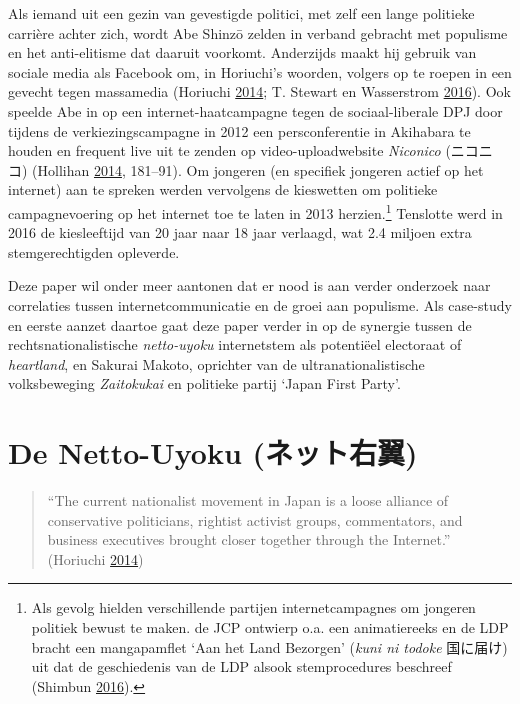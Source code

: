 \documentclass[10.5pt,dutch,]{article}
\begin{document}
Als iemand uit een gezin van gevestigde politici, met zelf een lange
politieke carrière achter zich, wordt Abe Shinzō zelden in verband
gebracht met populisme en het anti-elitisme dat daaruit voorkomt.
Anderzijds maakt hij gebruik van sociale media als Facebook om, in
Horiuchi's woorden, volgers op te roepen in een gevecht tegen massamedia
(Horiuchi \protect\hyperlink{ref-horiuchiux5fpublicux5f2014}{2014}; T.
Stewart en Wasserstrom
\protect\hyperlink{ref-t.ux5fstewartux5fglobalux5f2016}{2016}). Ook
speelde Abe in op een internet-haatcampagne tegen de sociaal-liberale
DPJ door tijdens de verkiezingscampagne in 2012 een persconferentie in
Akihabara te houden en frequent live uit te zenden op
video-uploadwebsite \emph{Niconico} (ニコニコ) (Hollihan
\protect\hyperlink{ref-hollihanux5fdisputeux5f2014}{2014}, 181--91). Om
jongeren (en specifiek jongeren actief op het internet) aan te spreken
werden vervolgens de kieswetten om politieke campagnevoering op het
internet toe te laten in 2013 herzien.\footnote{Als gevolg hielden
  verschillende partijen internetcampagnes om jongeren politiek bewust
  te maken. de JCP ontwierp o.a. een animatiereeks en de LDP bracht een
  mangapamflet `Aan het Land Bezorgen' (\emph{kuni ni todoke} 国に届け)
  uit dat de geschiedenis van de LDP alsook stemprocedures beschreef
  (Shimbun
  \protect\hyperlink{ref-asahiux5fshimbunux5felectionsux5f2016}{2016}).}
Tenslotte werd in 2016 de kiesleeftijd van 20 jaar naar 18 jaar
verlaagd, wat 2.4 miljoen extra stemgerechtigden opleverde.

Deze paper wil onder meer aantonen dat er nood is aan verder onderzoek
naar correlaties tussen internetcommunicatie en de groei aan populisme.
Als case-study en eerste aanzet daartoe gaat deze paper verder in op de
synergie tussen de rechtsnationalistische \emph{netto-uyoku}
internetstem als potentiëel electoraat of \emph{heartland}, en Sakurai
Makoto, oprichter van de ultranationalistische volksbeweging
\emph{Zaitokukai} en politieke partij `Japan First Party'.

\newpage

\section{De Netto-Uyoku
(ネット右翼)}\label{de-netto-uyoku-ux30cdux30c3ux30c8ux53f3ux7ffc}

\begin{quote}
``The current nationalist movement in Japan is a loose alliance of
conservative politicians, rightist activist groups, commentators, and
business executives brought closer together through the Internet.''
(Horiuchi \protect\hyperlink{ref-horiuchiux5fpublicux5f2014}{2014})
\end{quote}
\end{document}
